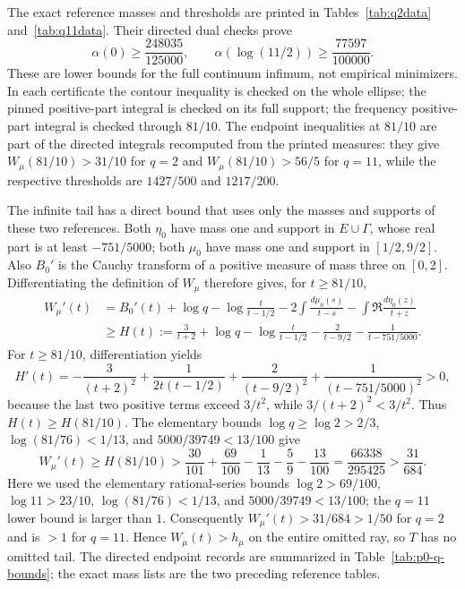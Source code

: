 The exact reference masses and thresholds are printed in
Tables~\ref{tab:q2data} and~\ref{tab:q11data}.  Their directed dual checks
prove
\begin{equation}\label{eq:p0-q-endpoint-bounds}
 \alpha(0)\ge\frac{248035}{125000},\qquad
 \alpha(\log(11/2))\ge\frac{77597}{100000}.
\end{equation}
These are lower bounds for the full continuum infimum, not empirical
minimizers.  In each certificate the contour inequality is checked on the
whole ellipse; the pinned positive-part integral is checked on its full
support; the frequency positive-part integral is checked through $81/10$.
The endpoint inequalities at $81/10$ are part of the directed integrals
recomputed from the printed measures: they give $W_\mu(81/10)>31/10$
for $q=2$ and $W_\mu(81/10)>56/5$ for $q=11$, while the respective thresholds
are $1427/500$ and $1217/200$.

The infinite tail has a direct bound that uses only the masses and supports
of these two references.  Both $\eta_0$ have mass one and support in
$E\cup\Gamma$, whose real part is at least $-751/5000$; both $\mu_0$ have
mass one and support in $[1/2,9/2]$.  Also $B_0'$ is the Cauchy transform
of a positive measure of mass three on $[0,2]$.  Differentiating the
definition of $W_\mu$ therefore gives, for $t\ge81/10$,
\begin{align*}
 W_\mu'(t)
 &=B_0'(t)+\log q-\log\frac{t}{t-1/2}
   -2\int\frac{d\mu_0(s)}{t-s}
   -\int\Re\frac{d\eta_0(z)}{t+z}\\
 &\ge H(t):=\frac3{t+2}+\log q-\log\frac{t}{t-1/2}
       -\frac2{t-9/2}-\frac1{t-751/5000}.
\end{align*}
For $t\ge81/10$, differentiation yields
\[
H'(t)=-\frac3{(t+2)^2}+\frac1{2t(t-1/2)}
       +\frac2{(t-9/2)^2}+\frac1{(t-751/5000)^2}>0,
\]
because the last two positive terms exceed $3/t^2$, while
$3/(t+2)^2<3/t^2$.  Thus $H(t)\ge H(81/10)$.  The elementary bounds
$\log q\ge\log2>2/3$, $\log(81/76)<1/13$, and
$5000/39749<13/100$ give
\[
W_\mu'(t)\ge H(81/10)>
\frac{30}{101}+\frac{69}{100}-\frac1{13}-\frac59-\frac{13}{100}
=\frac{66338}{295425}>\frac{31}{684}.
\]
Here we used the elementary rational-series bounds
$\log2>69/100$, $\log11>23/10$, $\log(81/76)<1/13$, and
$5000/39749<13/100$; the $q=11$ lower bound is larger than $1$.
Consequently $W_\mu'(t)>31/684>1/50$ for $q=2$ and is $>1$ for
$q=11$.  Hence $W_\mu(t)>h_\mu$ on the entire omitted ray, so $T$ has no
omitted tail.  The directed endpoint records are summarized in
Table~\ref{tab:p0-q-bounds}; the exact mass lists are the two preceding
reference tables.

